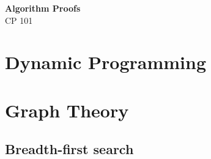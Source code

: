 \documentclass[11pt]{article}
\begin{document}
\begin{center}
    {\LARGE \bf Algorithm Proofs}\\
    {\large CP 101}\\
\end{center}

\section{Dynamic Programming}

\section{Graph Theory}
\subsection{Breadth-first search}
\end{document}
